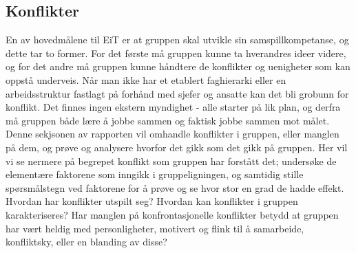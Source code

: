 \subsection{Konflikter}

En av hovedmålene til EiT er at gruppen skal utvikle sin samspillkompetanse\cite{eitlaeringsmaal}, og dette tar to former. For det første må gruppen kunne ta hverandres ideer videre, og for det andre må gruppen kunne håndtere de konflikter og uenigheter som kan oppstå underveis. Når man ikke har et etablert faghierarki eller en arbeidsstruktur fastlagt på forhånd med sjefer og ansatte kan det bli grobunn for konflikt. Det finnes ingen ekstern myndighet - alle starter på lik plan, og derfra må gruppen både lære å jobbe sammen og faktisk jobbe sammen mot målet. Denne sekjsonen av rapporten vil omhandle konflikter i gruppen, eller manglen på dem, og prøve og analysere hvorfor det gikk som det gikk på gruppen. Her vil vi se nermere på begrepet konflikt som gruppen har forstått det; undersøke de elementære faktorene som inngikk i gruppeligningen, og samtidig stille spørsmålstegn ved faktorene for å prøve og se hvor stor en grad de hadde effekt. Hvordan har konflikter utspilt seg? Hvordan kan konflikter i gruppen karakteriseres? Har manglen på konfrontasjonelle konflikter betydd at gruppen har vært heldig med personligheter, motivert og flink til å samarbeide, konfliktsky, eller en blanding av disse?
